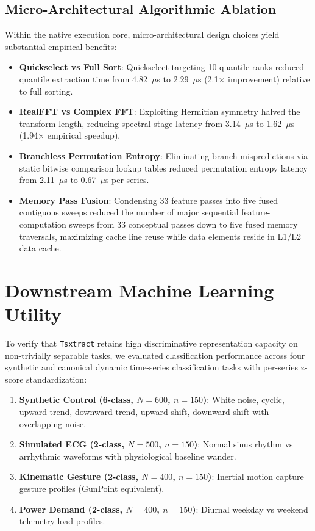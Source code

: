 \documentclass[conference]{IEEEtran}
\newcommand{\tsxtract}{\texttt{Tsxtract}}
\begin{document}
\subsection{Micro-Architectural Algorithmic Ablation}
Within the native execution core, micro-architectural design choices yield substantial empirical benefits:
\begin{itemize}
    \item \textbf{Quickselect vs Full Sort}: Quickselect targeting 10 quantile ranks reduced quantile extraction time from 4.82~$\mu$s to 2.29~$\mu$s (2.1$\times$ improvement) relative to full sorting.
    \item \textbf{RealFFT vs Complex FFT}: Exploiting Hermitian symmetry halved the transform length, reducing spectral stage latency from 3.14~$\mu$s to 1.62~$\mu$s (1.94$\times$ empirical speedup).
    \item \textbf{Branchless Permutation Entropy}: Eliminating branch mispredictions via static bitwise comparison lookup tables reduced permutation entropy latency from 2.11~$\mu$s to 0.67~$\mu$s per series.
    \item \textbf{Memory Pass Fusion}: Condensing 33 feature passes into five fused contiguous sweeps reduced the number of major sequential feature-computation sweeps from 33 conceptual passes down to five fused memory traversals, maximizing cache line reuse while data elements reside in L1/L2 data cache.
\end{itemize}

\section{Downstream Machine Learning Utility}
\label{sec:downstream_ml}
To verify that \tsxtract{} retains high discriminative representation capacity on non-trivially separable tasks, we evaluated classification performance across four synthetic and canonical dynamic time-series classification tasks with per-series z-score standardization:
\begin{enumerate}
    \item \textbf{Synthetic Control (6-class, $N=600$, $n=150$)}: White noise, cyclic, upward trend, downward trend, upward shift, downward shift with overlapping noise.
    \item \textbf{Simulated ECG (2-class, $N=500$, $n=150$)}: Normal sinus rhythm vs arrhythmic waveforms with physiological baseline wander.
    \item \textbf{Kinematic Gesture (2-class, $N=400$, $n=150$)}: Inertial motion capture gesture profiles (GunPoint equivalent).
    \item \textbf{Power Demand (2-class, $N=400$, $n=150$)}: Diurnal weekday vs weekend telemetry load profiles.
\end{enumerate}
\end{document}
